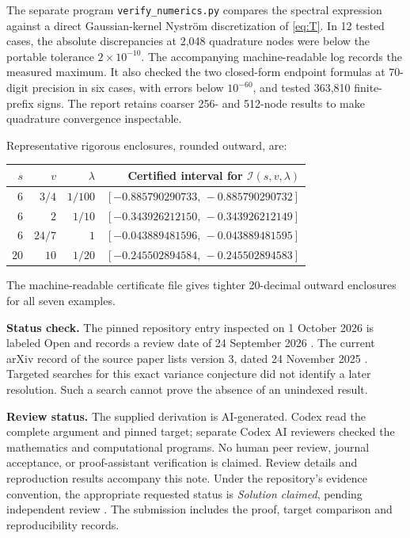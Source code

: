 \documentclass[11pt]{article}
\theoremstyle{remark}
\newcommand{\Ical}{\mathcal I}
\begin{document}
The separate program \texttt{verify\_numerics.py} compares the spectral expression against a direct Gaussian-kernel Nystr\"om discretization of \eqref{eq:T}. In 12 tested cases, the absolute discrepancies at 2,048 quadrature nodes were below the portable tolerance $2\times10^{-10}$. The accompanying machine-readable log records the measured maximum.
It also checked the two closed-form endpoint formulas at 70-digit precision in six cases, with errors below $10^{-60}$, and tested 363,810 finite-prefix signs.
The report retains coarser 256- and 512-node results to make quadrature convergence inspectable.

Representative rigorous enclosures, rounded outward, are:
\begin{center}
\small
\begin{tabular}{rrrr}
\toprule
$s$ & $v$ & $\lambda$ & Certified interval for $\Ical(s,v,\lambda)$\\
\midrule
$6$ & $3/4$ & $1/100$ & $[-0.885790290733,\,-0.885790290732]$\\
$6$ & $2$ & $1/10$ & $[-0.343926212150,\,-0.343926212149]$\\
$6$ & $24/7$ & $1$ & $[-0.043889481596,\,-0.043889481595]$\\
$20$ & $10$ & $1/20$ & $[-0.245502894584,\,-0.245502894583]$\\
\bottomrule
\end{tabular}
\end{center}
The machine-readable certificate file gives tighter 20-decimal outward enclosures for all seven examples.

\textbf{Status check.} The pinned repository entry inspected on 1 October 2026 is labeled Open and records a review date of 24 September 2026 \cite{aim}. The current arXiv record of the source paper lists version 3, dated 24 November 2025 \cite{chen}. Targeted searches for this exact variance conjecture did not identify a later resolution. Such a search cannot prove the absence of an unindexed result.

\textbf{Review status.} The supplied derivation is AI-generated. Codex read the complete argument and pinned target; separate Codex AI reviewers checked the mathematics and computational programs. No human peer review, journal acceptance, or proof-assistant verification is claimed. Review details and reproduction results accompany this note. Under the repository's evidence convention, the appropriate requested status is \emph{Solution claimed}, pending independent review \cite{contributing}. The submission includes the proof, target comparison and reproducibility records.
\end{document}
